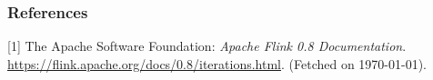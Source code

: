\subsubsection*{References}


\small{
[1] The Apache Software Foundation: {\it Apache Flink 0.8 Documentation}. 
\url{https://flink.apache.org/docs/0.8/iterations.html}. (Fetched on \today).
}